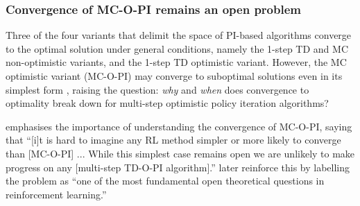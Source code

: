 

\subsubsection{Convergence of MC-O-PI remains an open problem}

Three of the four variants that delimit the space of PI-based algorithms converge to the optimal solution under general conditions, namely the 1-step TD and MC non-optimistic variants, and the 1-step TD optimistic variant.
However, the MC optimistic variant (MC-O-PI) may converge to suboptimal solutions even in its simplest form \citep[Example~5.12]{Bertsekas1996Neuro-DynamicProgramming},
raising the question: \textit{why} and \textit{when} does convergence to optimality break down for multi-step optimistic policy iteration algorithms?

\citet[p.~13]{Sutton1999OpenLearning} emphasises the importance of understanding the convergence of MC-O-PI, saying that
``[i]t is hard to imagine any RL method simpler or more likely to converge than [MC-O-PI] ...
While this simplest case remains open we are unlikely to make progress on any [multi-step TD-O-PI algorithm].''
\citet[p.~99]{Sutton2018ReinforcementIntroduction} later reinforce this by labelling the problem as
``one of the most fundamental open theoretical questions in reinforcement learning.''





